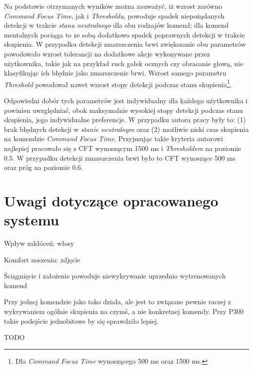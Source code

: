 \documentclass[skorowidz,skroty]{dyplomWEZUT}
\begin{document}
Na podstawie otrzymanych wyników można zauważyć, iż wzrost zarówno \textit{Command Focus Time}, jak i \textit{Thresholdu}, powoduje spadek niepożądanych detekcji w trakcie \textit{stanu neutralnego} dla obu rodzajów komend; dla komend mentalnych pociąga to ze sobą dodatkowo spadek poprawnych detekcji w trakcie skupienia. W przypadku detekcji zmarszczenia brwi zwiększanie obu parametrów powodowało wzrost tolerancji na dodatkowe akcje wykonywane przez użytkownika, takie jak na przykład ruch gałek ocznych czy obracanie głową, nie klasyfikując ich błędnie jako zmarszczenie brwi. Wzrost samego parametru \textit{Threshold} powodował nawet wzrost stopy detekcji podczas stanu skupienia\footnote{Dla \textit{Command Focus Time} wynoszącego 500 ms oraz 1500 ms.}. 

Odpowiedni dobór tych parametrów jest indywidualny dla każdego użytkownika i powinien uwzględniać, obok maksymalnie wysokiej stopy detekcji podczas stanu skupienia, jego indywidualne preferencje. W przypadku autora pracy były to: (1) brak błędnych detekcji w \textit{stanie neutralnym} oraz (2) możliwie niski czas skupienia na komendzie \textit{Command Focus Time}. Przyjmując takie kryteria autorowi najlepiej pracowało się z CFT wynoszącym 1500 ms i \textit{Thresholdem} na poziomie 0.5. W przypadku detekcji zmarszczenia brwi było to CFT wynoszące 500 ms oraz próg na poziomie 0.6.


\section{Uwagi dotyczące opracowanego systemu}
Wpływ zakłóceń: włosy

Komfort noszenia: zdjęcie

Ściągnięcie i założenie powoduje niewykrywanie uprzednio wytrenowanych komend

Przy jednej komendzie jako tako działa, ale jest to związane pewnie raczej z wykrywaniem ogólnie skupienia na czymś, a nie konkretnej komendy. Przy P300 takie podejście jednobitowe by się sprawdziło lepiej.

\FloatBarrier
\begin{zakonczenie}\label{chap:zakonczenie}
TODO
\end{zakonczenie}

\printbibliography[heading=bibintoc]

\listoftables

\listoffigures

\listoflistings


\printindex
\end{document}
